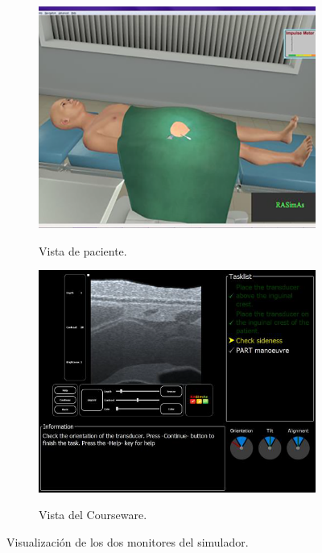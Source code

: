 \begin{figure}[ht]
    \begin{subfigure}[b]{0.5\linewidth}
        \centering
        {\includegraphics[width=\linewidth]{IMG/vistapaciente.png}}
        \caption{Vista de paciente.}
    \end{subfigure}
    \null\hfill
     \begin{subfigure}[b]{0.5\linewidth}
        \centering
        {\includegraphics[width=\linewidth]{IMG/courseware.png}}
        \caption{Vista del \ac{Courseware}.}
    \end{subfigure}
    \caption{Visualización de los dos monitores del simulador. \label{fig:simui}}
   \end{figure}

